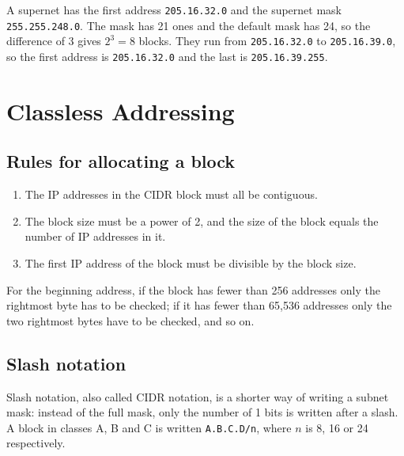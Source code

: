 \documentclass[11pt,a4paper]{article}
\begin{document}
A supernet has the first address \texttt{205.16.32.0} and the supernet mask
\texttt{255.255.248.0}. The mask has 21 ones and the default mask has 24, so the difference of
3 gives $2^{3} = 8$ blocks. They run from \texttt{205.16.32.0} to \texttt{205.16.39.0}, so the
first address is \texttt{205.16.32.0} and the last is \texttt{205.16.39.255}.

\newpage
\section{Classless Addressing}



\subsection{Rules for allocating a block}

\begin{enumerate}\itemsep3pt
  \item The IP addresses in the CIDR block must all be contiguous.
  \item The block size must be a power of 2, and the size of the block equals the number of IP
        addresses in it.
  \item The first IP address of the block must be divisible by the block size.
\end{enumerate}

For the beginning address, if the block has fewer than 256 addresses only the rightmost byte
has to be checked; if it has fewer than 65,536 addresses only the two rightmost bytes have to
be checked, and so on.

\subsection{Slash notation}

Slash notation, also called CIDR notation, is a shorter way of writing a subnet mask: instead
of the full mask, only the number of 1 bits is written after a slash. A block in classes A, B
and C is written \texttt{A.B.C.D/n}, where $n$ is 8, 16 or 24 respectively.
\end{document}
